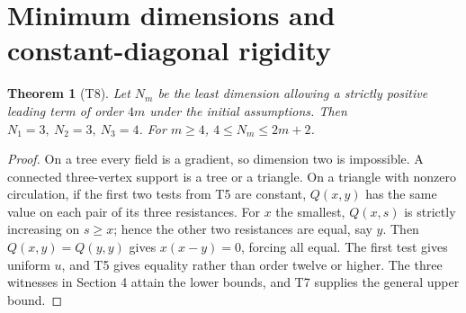 \documentclass[11pt]{article}
\newtheorem{theorem}{Theorem}
\begin{document}
\section{Minimum dimensions and constant-diagonal rigidity}
\begin{theorem}[T8]
Let \(N_m\) be the least dimension allowing a strictly positive leading
term of order \(4m\) under the initial assumptions. Then
\(N_1=3,\ N_2=3,\ N_3=4\). For \(m\geq4\),
\(4\leq N_m\leq2m+2\).
\end{theorem}
\begin{proof}
On a tree every field is a gradient, so dimension two is impossible.
A connected three-vertex support is a tree or a triangle. On a triangle
with nonzero circulation, if the first two tests from T5 are constant,
\(Q(x,y)\) has the same value on each pair of its three resistances.
For \(x\) the smallest, \(Q(x,s)\) is strictly increasing on \(s\geq x\);
hence the other two resistances are equal, say \(y\). Then
\(Q(x,y)=Q(y,y)\) gives \(x(x-y)=0\), forcing all equal. The first test
gives uniform \(u\), and T5 gives equality rather than order twelve
or higher. The three witnesses in Section 4 attain the lower bounds,
and T7 supplies the general upper bound.
\end{proof}
\end{document}
